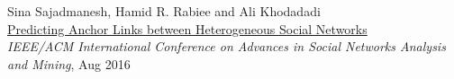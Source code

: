 \documentclass[10pt]{article}
\begin{document}
\begin{outerlist}
	\item {Sina Sajadmanesh}, Hamid R. Rabiee and Ali Khodadadi\\
	\href{https://arxiv.org/pdf/1607.08821}{{Predicting Anchor Links between Heterogeneous Social Networks}}\\
	\textit{IEEE/ACM International Conference on Advances in Social Networks Analysis and Mining},  Aug 2016

\end{outerlist}









\end{document}
